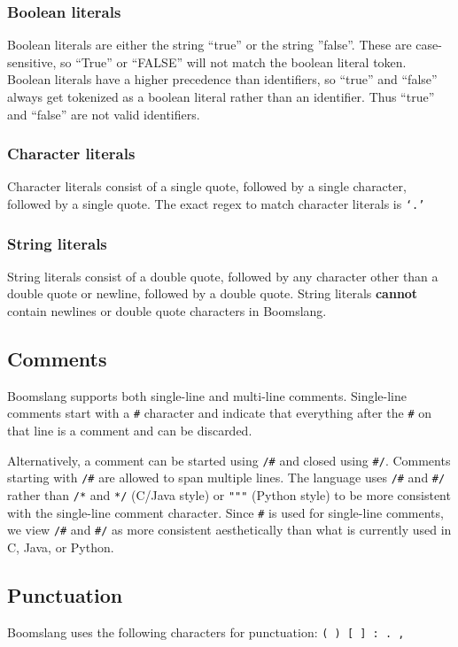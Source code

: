 \documentclass{article}
\begin{document}
\subsubsection{Boolean literals}
Boolean literals are either the string ``true'' or the string ''false''. These are case-sensitive, so ``True'' or ``FALSE'' will not match the boolean literal token. Boolean literals have a higher precedence than identifiers, so ``true'' and ``false'' always get tokenized as a boolean literal rather than an identifier. Thus ``true'' and ``false'' are not valid identifiers.

\subsubsection{Character literals}
Character literals consist of a single quote, followed by a single character, followed by a single quote. The exact regex to match character literals is \texttt{`.'} 

\subsubsection{String literals}
String literals consist of a double quote, followed by any character other than a double quote or newline, followed by a double quote. String literals \textbf{cannot} contain newlines or double quote characters in Boomslang.

\subsection{Comments}
Boomslang supports both single-line and multi-line comments. Single-line comments start with a \texttt{\#} character and indicate that everything after the \texttt{\#} on that line is a comment and can be discarded.

Alternatively, a comment can be started using \texttt{/\#} and closed using \texttt{\#/}. Comments starting with \texttt{/\#} are allowed to span multiple lines. The language uses \texttt{/\#} and \texttt{\#/} rather than \texttt{/*} and \texttt{*/} (C/Java style) or \texttt{"""} (Python style) to be more consistent with the single-line comment character. Since \texttt{\#} is used for single-line comments, we view \texttt{/\#} and \texttt{\#/} as more consistent aesthetically than what is currently used in C, Java, or Python.

\subsection{Punctuation}
Boomslang uses the following characters for punctuation: \texttt{( ) [ ] : . , \textunderscore} \newline
\end{document}
